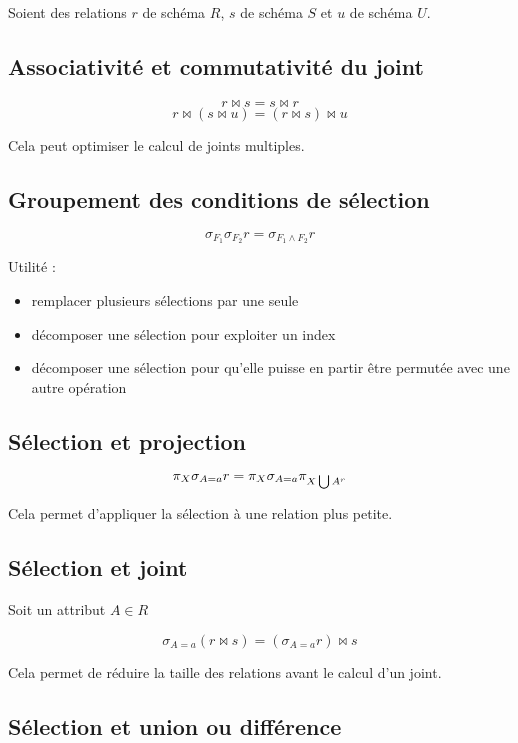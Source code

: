 	Soient des relations $r$ de schéma $R$, $s$ de schéma $S$ et $u$ de schéma $U$.

	
		\subsection{Associativité et commutativité du joint}
		
		$$r \Join s = s \Join r$$
		$$r \Join ( s \Join u) = (r \Join s ) \Join u$$
		
		Cela peut optimiser le calcul de joints multiples.
		
		
		\subsection{Groupement des conditions de sélection}
		
		$$\sigma_{F_1} \sigma_{F_2} r = \sigma_{F_1 \wedge F_2} r$$
		
		Utilité :
		
		\begin{itemize}
			\item remplacer plusieurs sélections par une seule
			\item décomposer une sélection pour exploiter un index
			\item décomposer une sélection pour qu'elle puisse en partir être permutée avec une autre opération
		\end{itemize}
		
		\subsection{Sélection et projection}
		
		$$\pi_X\sigma_{A = a} r = \pi_X\sigma_{A=a}\pi_{X \bigcup A^r}$$
		
		Cela permet d'appliquer la sélection à une relation plus petite.
		
		\subsection{Sélection et joint}
		
		Soit un attribut $A \in R$
		
		$$\sigma_{A = a} (r \Join s ) = (\sigma_{A = a} r ) \Join s$$
		
		Cela permet de réduire la taille des relations avant le calcul d'un joint.
		
		\subsection{Sélection et union ou différence}
		
